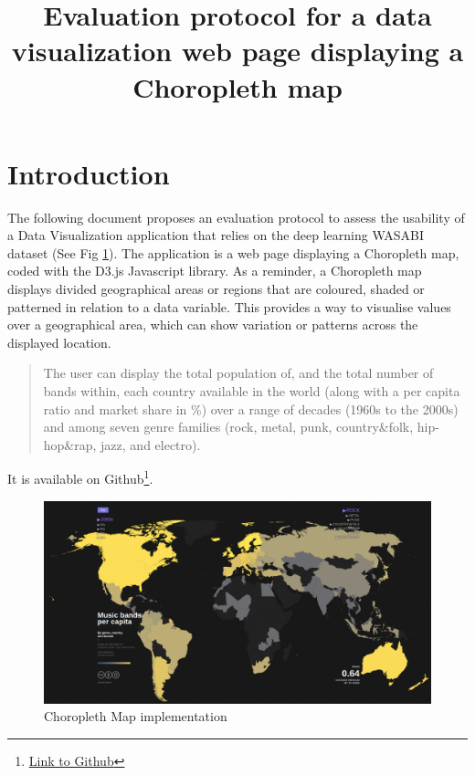 \documentclass[twocolumn, letterpaper,13pt]{scrartcl}
\begin{document}
    \title{\color{seablue}Evaluation protocol for a data visualization web page displaying a Choropleth map}

	\maketitle
	
    \section*{Introduction}
    
    The following document proposes an evaluation protocol to assess the usability of a Data Visualization application that relies on the deep learning WASABI dataset (See Fig \ref{fig:a}).
    \newline\newline
    The application is a web page displaying a Choropleth map, coded with the D3.js Javascript library. 
    \newline\newline
    As a reminder, a Choropleth map displays divided geographical areas or regions that are coloured, shaded or patterned in relation to a data variable. This provides a way to visualise values over a geographical area, which can show variation or patterns across the displayed location.
    \begin{quote}
        The user can display the total population of, and the total number of bands within, each country available in the world (along with a per capita ratio and market share in \%) over a range of decades (1960s to the 2000s) and among seven genre families (rock, metal, punk, country\&folk, hip-hop\&rap, jazz, and electro).
    \end{quote}
    It is available on Github\footnote{\href{https://github.com/LMquentinLR/choropleth\_wasabi\_dataset}{Link to Github}}.
    
    \begin{figure}	\includegraphics[width=0.98\linewidth]{map.png}
    \caption{Choropleth Map implementation\label{fig:a}}
    \end{figure}
    
\end{document}
